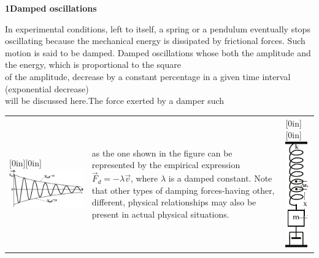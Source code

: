 \documentclass[a4paper,12pt,oneside]{report}
\newenvironment{tree}[4]{
\begin{list}{#1}{\parskip=0in \topsep=0in \itemsep=0in \parsep=0in \partopsep=0in \leftmargin=#2 \rightmargin=#3 \itemindent=#4 \listparindent=\itemindent}
}{\end{list}}
\newenvironment{ssection}[5]{
\phantom{#1}\textbf{#2\space#3}
\begin{tree}{#4}{0in}{0in}{#5}
}{\end{tree}}
\begin{document}
\begin{ssection}{\quad}{1}{Damped oscillations}{\textbullet}{\parindent}
\item In experimental conditions, left to itself, a spring or a pendulum eventually stops oscillating because the mechanical energy is dissipated by frictional forces. Such motion is said to be damped. Damped oscillations whose both the amplitude and the energy, which is proportional to the square\\\indent of the amplitude, decrease by a constant percentage in a given time interval (exponential decrease)\\\phantom{Damped oscillations whose both the }will be discussed here.The force exerted by a damper such\\
\begin{tabular}{lp{}l}
\raisebox{-107pt}[0in][0in]{\includegraphics[scale=1]{figures/15Dec1.pdf}}
& as the one shown in the figure can be represented by the empirical expression $\vec{F}_{d}=-\lambda\vec{v}$, where $\lambda$ is a damped constant. Note that other types of damping forces-having other, different, physical relationships may also be present in actual physical situations.
&\raisebox{-107pt}[0in][0in]{\includegraphics[scale=1]{figures/16Dec1.pdf}}

\end{tabular}
\end{ssection}
\end{document}
